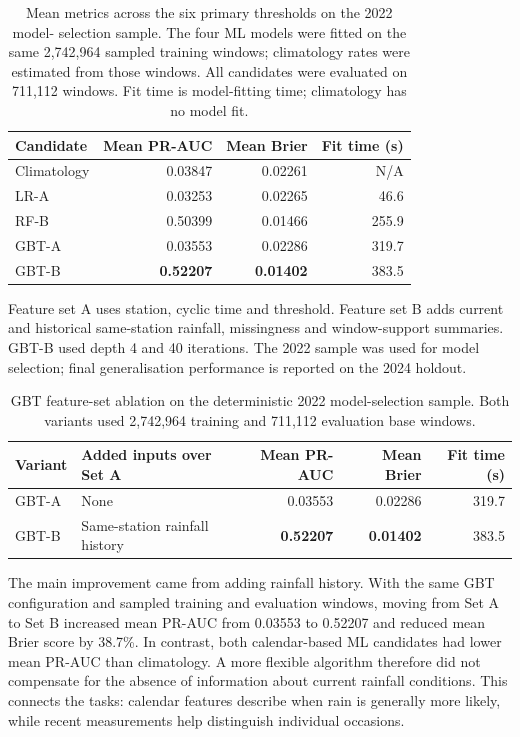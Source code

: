 \documentclass[11pt,a4paper]{article}
\begin{document}
\begin{table}[htbp]
\centering\small
\caption{Mean metrics across the six primary thresholds on the 2022 model-
selection sample. The four ML models were fitted on the same 2,742,964 sampled
training windows; climatology rates were estimated from those windows. All
candidates were evaluated on 711,112 windows. Fit time is model-fitting time;
climatology has no model fit.}
\label{tab:selection}
\begin{tabular}{l r r r}
\toprule
Candidate & Mean PR-AUC & Mean Brier & Fit time (s) \\
\midrule
Climatology & 0.03847 & 0.02261 & N/A \\
LR-A & 0.03253 & 0.02265 & 46.6 \\
RF-B & 0.50399 & 0.01466 & 255.9 \\
GBT-A & 0.03553 & 0.02286 & 319.7 \\
GBT-B & \textbf{0.52207} & \textbf{0.01402} & 383.5 \\
\bottomrule
\end{tabular}
\end{table}

Feature set A uses station, cyclic time and threshold. Feature set B adds
current and historical same-station rainfall, missingness and window-support
summaries. GBT-B used depth 4 and 40 iterations. The 2022 sample was used for
model selection; final generalisation performance is reported on the 2024
holdout.

\begin{table}[htbp]
\centering\small
\caption{GBT feature-set ablation on the deterministic 2022 model-selection
sample. Both variants used 2,742,964 training and 711,112 evaluation base
windows.}
\label{tab:feature-ablation}
\begin{tabular}{l l r r r}
\toprule
Variant & Added inputs over Set A & Mean PR-AUC & Mean Brier & Fit time (s) \\
\midrule
GBT-A & None & 0.03553 & 0.02286 & 319.7 \\
GBT-B & Same-station rainfall history & \textbf{0.52207} &
\textbf{0.01402} & 383.5 \\
\bottomrule
\end{tabular}
\end{table}

The main improvement came from adding rainfall history. With the same GBT
configuration and sampled training and evaluation windows, moving from Set A
to Set B increased mean PR-AUC from 0.03553 to 0.52207 and reduced mean Brier
score by 38.7\%. In contrast, both calendar-based ML candidates had lower
mean PR-AUC than climatology. A more flexible algorithm therefore did not
compensate for the absence of information about current rainfall conditions.
This connects the tasks: calendar features describe when rain is generally
more likely, while recent measurements help distinguish individual occasions.
\end{document}

